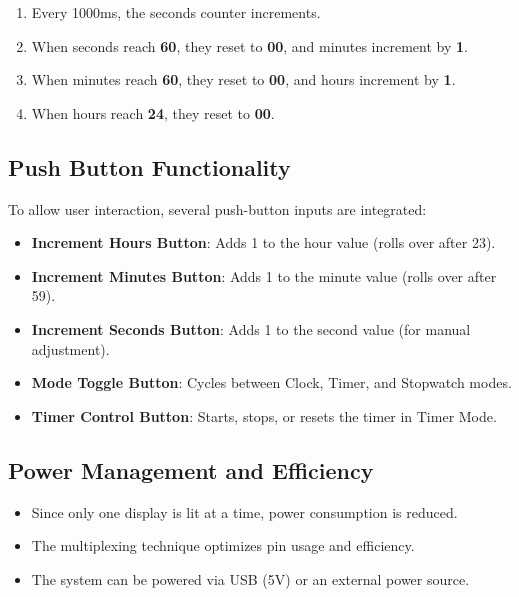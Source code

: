 \documentclass[journal]{IEEEtran}
\begin{document}
\begin{itemize}
    \begin{enumerate}
        \item Every 1000ms, the seconds counter increments.
        \item When seconds reach \textbf{60}, they reset to \textbf{00}, and minutes increment by \textbf{1}.
        \item When minutes reach \textbf{60}, they reset to \textbf{00}, and hours increment by \textbf{1}.
        \item When hours reach \textbf{24}, they reset to \textbf{00}.
    \end{enumerate}
\end{itemize}

\subsection{Push Button Functionality}

To allow user interaction, several push-button inputs are integrated:

\begin{itemize}
    \item \textbf{Increment Hours Button}: Adds 1 to the hour value (rolls over after 23).
    \item \textbf{Increment Minutes Button}: Adds 1 to the minute value (rolls over after 59).
    \item \textbf{Increment Seconds Button}: Adds 1 to the second value (for manual adjustment).
    \item \textbf{Mode Toggle Button}: Cycles between Clock, Timer, and Stopwatch modes.
    \item \textbf{Timer Control Button}: Starts, stops, or resets the timer in Timer Mode.
\end{itemize}

\subsection{Power Management and Efficiency}

\begin{itemize}
    \item Since only one display is lit at a time, power consumption is reduced.
    \item The multiplexing technique optimizes pin usage and efficiency.
    \item The system can be powered via USB (5V) or an external power source.
\end{itemize}
\end{document}
